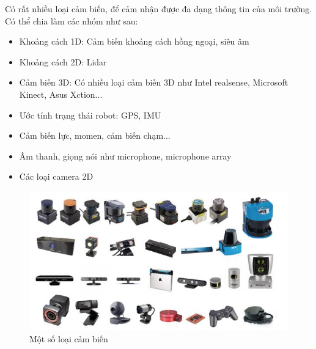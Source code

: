 Có rất nhiều loại cảm biến, để cảm nhận được đa dạng thông tin của môi trường. Có thể chia làm các nhóm như sau:
\begin{itemize}
	\item Khoảng cách 1D: Cảm biến khoảng cách hồng ngoại, siêu âm
	\item Khoảng cách 2D: Lidar
	\item Cảm biến 3D: Có nhiều loại cảm biến 3D như Intel realsense, Microsoft Kinect, Asus Xction...
	\item Ước tính trạng thái robot: GPS, IMU
	\item Cảm biến lực, momen, cảm biến chạm...
	\item Âm thanh, giọng nói như microphone, microphone array
	\item Các loại camera 2D
\end{itemize}

\begin{figure}
	\centering
	\includegraphics[width=\linewidth]{chapter1/figs/CacloaiCB.JPG}
	\caption{Một số loại cảm biến}
	\label{fig:cacLoaiCambien}
\end{figure}

